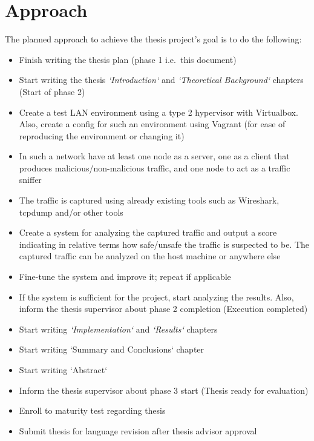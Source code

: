 \documentclass[11pt,a4paper,oneside]{article}
\begin{document}
    \section{Approach}\label{sec:approach}
    The planned approach to achieve the thesis project's goal is to do the following:
    \begin{itemize}
    \item Finish writing the thesis plan (phase 1 i.e.\ this document)
    \item Start writing the thesis \textit{`Introduction`} and \textit{`Theoretical Background`} chapters (Start of phase 2)
    \item Create a test LAN environment using a type 2 hypervisor with Virtualbox.
    Also, create a config for such an environment using Vagrant (for ease of reproducing the environment or changing it)
    \item In such a network have at least one node as a server, one as a client that produces malicious/non-malicious traffic, and one node to act as a traffic sniffer
    \item The traffic is captured using already existing tools such as Wireshark, tcpdump and/or other tools
    \item Create a system for analyzing the captured traffic and output a score indicating in relative terms how safe/unsafe the traffic is suspected to be.
    The captured traffic can be analyzed on the host machine or anywhere else
    \item Fine-tune the system and improve it;
    repeat if applicable
    \item If the system is sufficient for the project, start analyzing the results.
    Also, inform the thesis supervisor about phase 2 completion (Execution completed)
    \item Start writing \textit{`Implementation`} and \textit{`Results`} chapters
    \item Start writing `Summary and Conclusions` chapter
    \item Start writing `Abstract`
    \item Inform the thesis supervisor about phase 3 start (Thesis ready for evaluation)
    \item Enroll to maturity test regarding thesis
    \item Submit thesis for language revision after thesis advisor approval
    \end{itemize}
\end{document}
